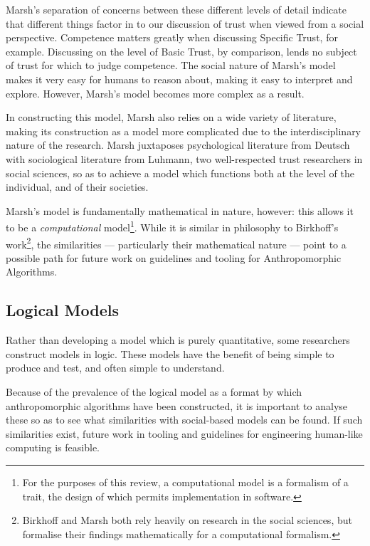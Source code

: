 \documentclass[11pt,english,twocolumn]{article}
\begin{document}
Marsh's separation of concerns between these different levels of detail indicate that different things factor in to our discussion of trust when viewed from a social perspective. Competence matters greatly when discussing Specific Trust, for example. Discussing on the level of Basic Trust, by comparison, lends no subject of trust for which to judge competence. The social nature of Marsh's model makes it very easy for humans to reason about, making it easy to interpret and explore. However, Marsh's model becomes more complex as a result.\par

In constructing this model, Marsh also relies on a wide variety of literature, making its construction as a model more complicated due to the interdisciplinary nature of the research. Marsh juxtaposes psychological literature from Deutsch\cite{deutsch1962cooperation} with sociological literature from Luhmann\cite{luhmann2000familiarity}, two well-respected trust researchers in social sciences, so as to achieve a model which functions both at the level of the individual, and of their societies.\par

Marsh's model is fundamentally mathematical in nature, however: this allows it to be a \emph{computational} model\footnote{For the purposes of this review, a computational model is a formalism of a trait, the design of which permits implementation in software.}. While it is similar in philosophy to Birkhoff's work\footnote{Birkhoff and Marsh both rely heavily on research in the social sciences, but formalise their findings mathematically for a computational formalism.}, the similarities --- particularly their mathematical nature --- point to a possible path for future work on guidelines and tooling for Anthropomorphic Algorithms.\par

\subsection{Logical Models}
Rather than developing a model which is purely quantitative, some researchers construct models in logic. These models have the benefit of being simple to produce and test, and often simple to understand.\par

Because of the prevalence of the logical model as a format by which anthropomorphic algorithms have been constructed, it is important to analyse these so as to see what similarities with social-based models can be found. If such similarities exist, future work in tooling and guidelines for engineering human-like computing is feasible.\par
\end{document}
